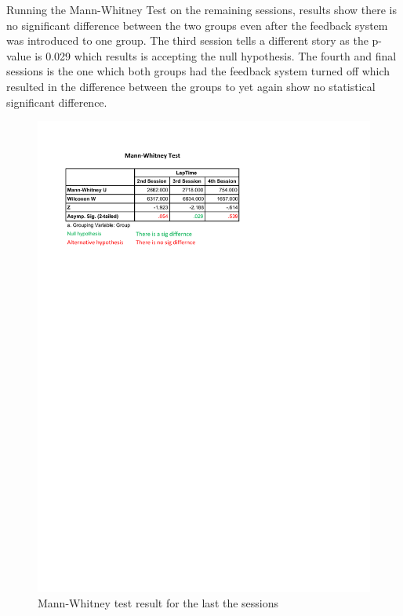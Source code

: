 Running the Mann-Whitney Test on the remaining sessions, results show there is no significant difference between the two groups even after the feedback system was introduced to one group. The third session tells a different story as the p-value is 0.029 which results is accepting the null hypothesis. The fourth and final sessions is the one which both groups had the feedback system turned off which resulted in the difference between the groups to yet again show no statistical significant difference.

\begin{figure}[!htb]
	\centering
	\includegraphics[width=\textwidth]{charts/Mann-Whitney-Sessions.pdf}
	\caption[Mann-Whitney Accross Sessions]{Mann-Whitney test result for the last the sessions}
	\label{fig:chart-Mann-Whitney-Sessions}
\end{figure}


